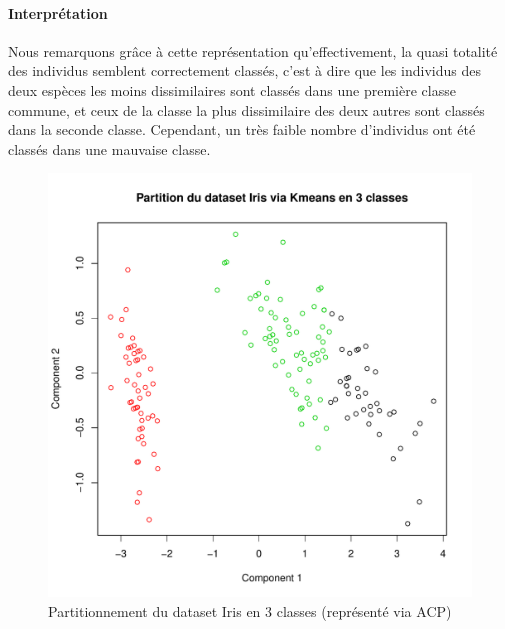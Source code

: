 \documentclass{report}
\begin{document}
\paragraph{Interprétation}
Nous remarquons grâce à cette représentation qu'effectivement, la quasi totalité des individus semblent correctement classés, c'est à dire que les individus des deux espèces les moins dissimilaires sont classés dans une première classe commune, et ceux de la classe la plus dissimilaire des deux autres sont classés dans la seconde classe. Cependant, un très faible nombre d'individus ont été classés dans une mauvaise classe.
\begin{figure}[ht!]
\begin{center}
    \includegraphics[width=\textwidth]{../plots/E3Q1_ki3.pdf}
    \caption{Partitionnement du dataset Iris en 3 classes (représenté via ACP)}
\end{center}
\end{figure}
\newpage
\end{document}
